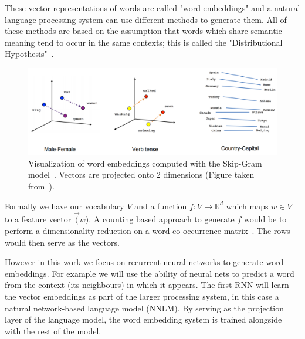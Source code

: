 These vector representations of words are called "word embeddings" and a natural language processing 
system can use different methods to generate them.
All of these methods are based on the assumption that words which share semantic meaning tend to occur in the same contexts;
this is called the "Distributional Hypothesis"~\cite{Sahlgren2008}. 

\begin{figure}[H]
\begin{center}
  \includegraphics[width=\textwidth]{./img/linear-relationships}
  \caption{Visualization of word embeddings computed with the Skip-Gram model~\cite{DBLP:journals/corr/MikolovSCCD13}. 
  Vectors are projected onto 2 dimensions (Figure taken from~\cite{tensorflow:word2vec}).}
  \label{fig:linear-relationships}
\end{center}
\end{figure}

Formally we have our vocabulary $V$ and a function $f: V \rightarrow \mathbb{R}^d$ which maps $w \in V$ to a feature vector $\vec(w)$. 
A counting based approach to generate $f$ would be to perform a dimensionality reduction 
on a word co-occurrence matrix~\cite{DBLP:journals/corr/LebretL13}. The rows would then serve as the vectors.

However in this work we focus on recurrent neural networks to generate word embeddings. 
For example we will use the ability of neural nets to predict a word from the context (its neighbours) in which it appears. 
The first RNN will learn the vector embeddings as part of the larger processing system, 
in this case a natural network-based language model (NNLM).
By serving as the projection layer of the language model, the word embedding system is trained alongside with the rest of the model. 







